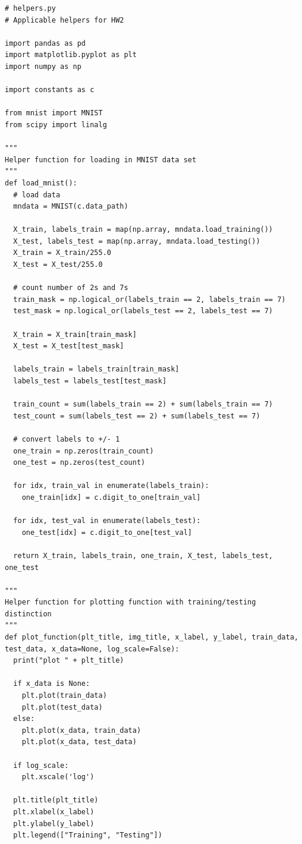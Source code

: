 \documentclass{article}
\newcommand{\1}{\mathbf{1}}
\begin{document}
{\begin{verbatim}
\end{verbatim}

\begin{verbatim}
# helpers.py
# Applicable helpers for HW2

import pandas as pd
import matplotlib.pyplot as plt
import numpy as np

import constants as c

from mnist import MNIST
from scipy import linalg

"""
Helper function for loading in MNIST data set
"""
def load_mnist():
  # load data
  mndata = MNIST(c.data_path)

  X_train, labels_train = map(np.array, mndata.load_training())
  X_test, labels_test = map(np.array, mndata.load_testing())
  X_train = X_train/255.0
  X_test = X_test/255.0

  # count number of 2s and 7s
  train_mask = np.logical_or(labels_train == 2, labels_train == 7)
  test_mask = np.logical_or(labels_test == 2, labels_test == 7)

  X_train = X_train[train_mask]
  X_test = X_test[test_mask]

  labels_train = labels_train[train_mask]
  labels_test = labels_test[test_mask]

  train_count = sum(labels_train == 2) + sum(labels_train == 7)
  test_count = sum(labels_test == 2) + sum(labels_test == 7)

  # convert labels to +/- 1
  one_train = np.zeros(train_count)
  one_test = np.zeros(test_count)

  for idx, train_val in enumerate(labels_train):
    one_train[idx] = c.digit_to_one[train_val]

  for idx, test_val in enumerate(labels_test):
    one_test[idx] = c.digit_to_one[test_val]

  return X_train, labels_train, one_train, X_test, labels_test, one_test

"""
Helper function for plotting function with training/testing distinction
"""
def plot_function(plt_title, img_title, x_label, y_label, train_data, test_data, x_data=None, log_scale=False):
  print("plot " + plt_title)

  if x_data is None:
    plt.plot(train_data)
    plt.plot(test_data)
  else:
    plt.plot(x_data, train_data)
    plt.plot(x_data, test_data)

  if log_scale:
    plt.xscale('log')

  plt.title(plt_title)
  plt.xlabel(x_label)
  plt.ylabel(y_label)
  plt.legend(["Training", "Testing"])


\end{verbatim}}
\end{document}
